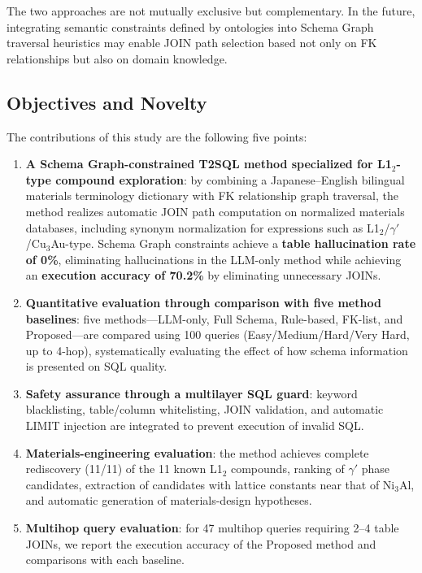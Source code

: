 \documentclass[5p,twocolumn]{elsarticle}
\begin{document}
The two approaches are not mutually exclusive but complementary.
In the future, integrating semantic constraints defined by ontologies into
Schema Graph traversal heuristics may enable JOIN path selection based not only on FK relationships
but also on domain knowledge.

\subsection{Objectives and Novelty}

The contributions of this study are the following five points:

\begin{enumerate}
  \item \textbf{A Schema Graph-constrained T2SQL method specialized for L1$_2$-type compound exploration}:
    by combining a Japanese--English bilingual materials terminology dictionary with FK relationship graph traversal,
    the method realizes automatic JOIN path computation on normalized materials databases,
    including synonym normalization for expressions such as L1$_2$/$\gamma'$/Cu$_3$Au-type.
    Schema Graph constraints achieve a \textbf{table hallucination rate of 0\%},
    eliminating hallucinations in the LLM-only method while
    achieving an \textbf{execution accuracy of 70.2\%} by eliminating unnecessary JOINs.
  \item \textbf{Quantitative evaluation through comparison with five method baselines}:
    five methods---LLM-only, Full Schema, Rule-based, FK-list, and Proposed---are compared using
    100 queries (Easy/Medium/Hard/Very Hard, up to 4-hop),
    systematically evaluating the effect of how schema information is presented on SQL quality.
  \item \textbf{Safety assurance through a multilayer SQL guard}:
    keyword blacklisting, table/column whitelisting,
    JOIN validation, and automatic LIMIT injection are integrated to
    prevent execution of invalid SQL.
  \item \textbf{Materials-engineering evaluation}:
    the method achieves complete rediscovery (11/11) of the 11 known L1$_2$ compounds,
    ranking of $\gamma'$ phase candidates, extraction of candidates with lattice constants near that of Ni$_3$Al,
    and automatic generation of materials-design hypotheses.
  \item \textbf{Multihop query evaluation}:
    for 47 multihop queries requiring 2--4 table JOINs,
    we report the execution accuracy of the Proposed method and comparisons with each baseline.
\end{enumerate}
\end{document}
